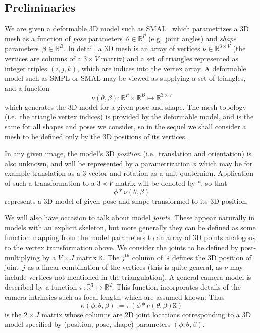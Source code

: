 \subsection{Preliminaries}
\def\R#1{{\mathbb{R}^{#1}}}
\def\RR#1#2{{\mathbb{R}^{#1 \times #2}}}
\def\posn{\phi}
\def\pose{\theta}
\def\npose{P}
\def\shape{\beta}
\def\nshape{B}
\def\verts{\nu}
\def\nverts{V}
\def\jointselect{\mathtt{K}}
\def\njoints{J}
We are given a deformable 3D model such as SMAL~\cite{zuffi2017menagerie} which parametrizes a 3D mesh as a function of {\em pose} parameters~$\pose \in \R\npose$ (e.g.\ joint angles) and {\em shape} parameters~$\shape \in \R\nshape$. 
In detail, a 3D mesh is an array of vertices $\verts \in \RR 3\nverts$ (the vertices are columns of a $3 \times \nverts$ matrix) and a set of triangles represented as integer triples $(i,j,k)$, which are indices into the vertex array.
A deformable model such as SMPL or SMAL may be viewed as supplying a set of triangles, and a function
\begin{equation}
\verts(\pose, \shape) : \R \npose \times \R \nshape \mapsto \RR 3 \nverts
\end{equation}
which generates the 3D model for a given pose and shape.
The mesh topology (i.e.~the triangle vertex indices) is provided by the deformable model, and is the same for all shapes and poses we consider, so in the sequel we shall consider a mesh to be defined only by the 3D positions of its vertices.

In any given image, the model's 3D {\em position} (i.e.\ translation and orientation) is also unknown, and will be represented by a parametrization $\posn$ which may be for example translation as a 3-vector and rotation as a unit quaternion. Application of such a transformation to a $3\times\nverts$ matrix will be denoted by $*$, so that 
\begin{equation}
\posn * \verts(\pose, \shape)
\end{equation}
represents a 3D model of given pose and shape transformed to its 3D position.

\def\proj{\pi}
We will also have occasion to talk about model {\em joints}.  These appear naturally in models with an explicit skeleton, but more generally they can be defined as some function mapping from the model parameters to an array of 3D points analogous to the vertex transformation above.  We consider the joints to be defined by post-multiplying by a $\nverts \times \njoints$ matrix $\jointselect$.  The $j^{\text{th}}$ column of~$\jointselect$ defines the 3D position of joint~$j$ as a linear combination of the vertices (this is quite general, as $\verts$ may include vertices not mentioned in the triangulation).  A general camera model is described by a function $\proj: \R 3 \mapsto \R 2$.  This function incorporates details of the camera intrinsics such as focal length, which are assumed known.  
Thus 
\begin{equation}
\kappa(\posn, \pose, \shape) := \proj(\posn * \verts(\pose, \shape) \jointselect)
\end{equation}
is the $2\times \njoints$ matrix whose columns are 2D joint locations corresponding to a 3D model specified by (position, pose, shape) parameters $(\posn, \pose, \shape)$.

